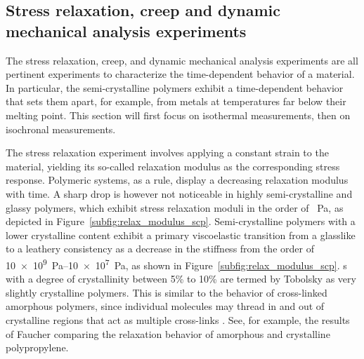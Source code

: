 \subsection{Stress relaxation, creep  and dynamic mechanical analysis experiments}
\label{sec:relax_creep_dma}

The stress relaxation, creep, and dynamic mechanical analysis experiments are all pertinent experiments to characterize the time-dependent behavior of a material.
In particular, the semi-crystalline polymers exhibit a time-dependent behavior that sets them apart, for example, from metals at temperatures far below their melting point.
This section will first focus on isothermal measurements, then on isochronal measurements.

The stress relaxation experiment involves applying a constant strain to the material, yielding its so-called relaxation modulus as the corresponding stress response.
Polymeric systems, as a rule, display a decreasing relaxation modulus with time.
A sharp drop is however not noticeable in highly semi-crystalline and glassy polymers, which exhibit stress relaxation moduli in the order of \si{\gigal\pascal}, as depicted in Figure~\ref{subfig:relax_modulus_scp}.
Semi-crystalline polymers with a lower crystalline content exhibit a primary viscoelastic transition from a glasslike to a leathery consistency as a decrease in the stiffness from the order of \SIrange{10e9}{10e7}{\pascal}, as shown in Figure~\ref{subfig:relax_modulus_scp}.
s with a degree of crystallinity between 5\% to 10\% are termed by Tobolsky \citep{tobolskyPropertiesStructurePolymers1960} as very slightly crystalline polymers.
This is similar to the behavior of cross-linked amorphous polymers, since individual molecules may thread in and out of crystalline regions that act as multiple cross-links \citep{ferryViscoelasticPropertiesPolymers1980, gsellYieldTransientEffects1981}.
See, for example, the results of Faucher \citep{faucherViscoelasticBehaviorPolyethylene1959} comparing the relaxation behavior of amorphous and crystalline polypropylene.


